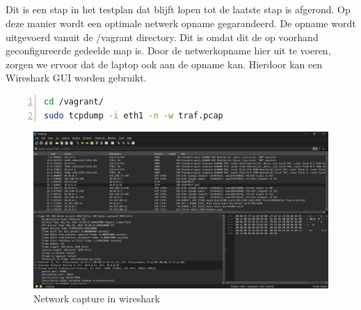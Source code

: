 \subsection{}%
\label{sec:Test-NIC}%

\subsection{}%
\label{sec:Test-capture}%

Dit is een stap in het testplan dat blijft lopen tot de laatste stap is afgerond. Op deze manier wordt een optimale netwerk opname gegarandeerd. De opname wordt uitgevoerd vanuit de /vagrant directory. Dit is omdat dit de op voorhand geconfigureerde gedeelde map is. Door de netwerkopname hier uit te voeren, zorgen we ervoor dat de laptop ook aan de opname kan. Hierdoor kan een Wireshark GUI worden gebruikt.

\begin{lstlisting}[basicstyle=\small, frame=single, breaklines=true, postbreak=\mbox{\textcolor{red}{$\hookrightarrow$}\space}, escapeinside ={\%,}, escapechar={!}, numbers=left, language=sh, caption=Tcpdump]
cd /vagrant/
sudo tcpdump -i eth1 -n -w traf.pcap
\end{lstlisting}

\begin{figure}[H]
    \includegraphics[width=\linewidth]{../graphics/POC-wireshark.png}
    \caption{Network capture in wireshark}
    \label{fig:wireshark}
\end{figure}

\subsection{}%
\label{sec:Test-ping}%



